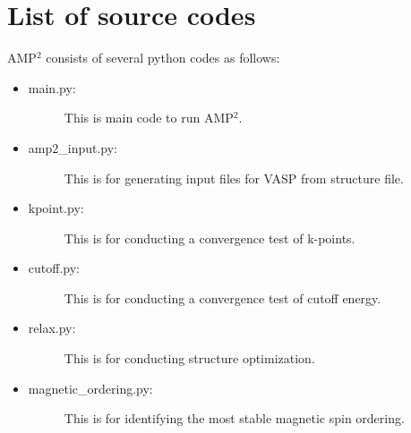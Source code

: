 \documentclass[letterpaper,10pt,english]{sphinxmanual}
\begin{document}
\section{List of source codes}
\label{\detokenize{Overview/Overview:list-of-source-codes}}
AMP$^{\text{2}}$ consists of several python codes as follows:
\begin{itemize}
\item {} \begin{description}
\item[{main.py:}] \leavevmode
This is main code to run AMP$^{\text{2}}$.

\end{description}

\item {} \begin{description}
\item[{amp2\_input.py:}] \leavevmode
This is for generating input files for VASP from structure file.

\end{description}

\item {} \begin{description}
\item[{kpoint.py:}] \leavevmode
This is for conducting a convergence test of k-points.

\end{description}

\item {} \begin{description}
\item[{cutoff.py:}] \leavevmode
This is for conducting a convergence test of cutoff energy.

\end{description}

\item {} \begin{description}
\item[{relax.py:}] \leavevmode
This is for conducting structure optimization.

\end{description}

\item {} \begin{description}
\item[{magnetic\_ordering.py:}] \leavevmode
This is for identifying the most stable magnetic spin ordering.

\end{description}


\end{itemize}
\end{document}
